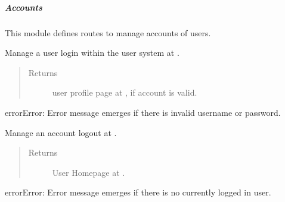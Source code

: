 \documentclass[a4paper,12pt,english]{sphinxmanual}
\begin{document}
\subparagraph{Accounts}
\label{\detokenize{project_rst/user_rst/routes:accounts}}
 

This module defines routes to manage accounts of users.

\begin{fulllineitems}
\label{\detokenize{project_rst/user_rst/routes:project.user.account.login}}
Manage a user login within the user system at .
\begin{quote}\begin{description}
\item[{Returns}] \leavevmode
user profile page at , if account is valid.

\end{description}\end{quote}

\begin{sphinxadmonition}{error}{Error:}
Error message emerges if there is invalid username or password.
\end{sphinxadmonition}

\end{fulllineitems}


\begin{fulllineitems}
\label{\detokenize{project_rst/user_rst/routes:project.user.account.logout}}
Manage an account logout at .
\begin{quote}\begin{description}
\item[{Returns}] \leavevmode
User Homepage at .

\end{description}\end{quote}

\begin{sphinxadmonition}{error}{Error:}
Error message emerges if there is no currently logged in user.
\end{sphinxadmonition}

\end{fulllineitems}
\end{document}
